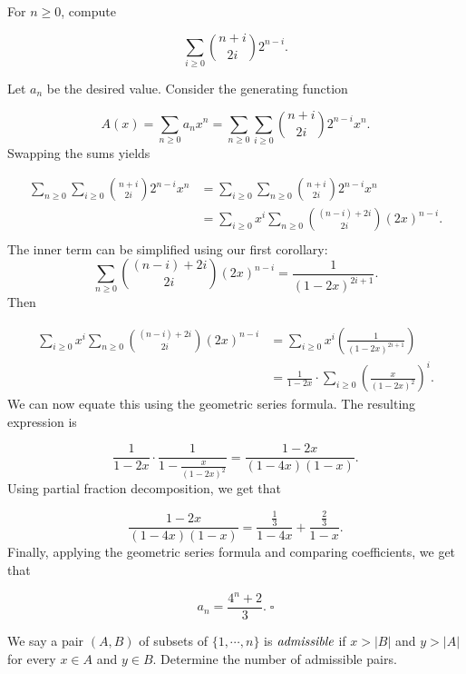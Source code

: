 \documentclass{article}
\begin{document}
\begin{exam}
For $n \ge 0$, compute

\[\sum_{i \ge 0}\binom{n+i}{2i}2^{n-i}.\]
\end{exam}
\begin{sol}
Let $a_n$ be the desired value. Consider the generating function

\[A(x) = \sum_{n \ge 0}a_nx^n = \sum_{n \ge 0}\sum_{i \ge 0}\binom{n+i}{2i}2^{n-i}x^n.\]
Swapping the sums yields

\begin{align*}
\sum_{n \ge 0}\sum_{i \ge 0}\binom{n+i}{2i}2^{n-i}x^n & = \sum_{i \ge 0}\sum_{n \ge 0}\binom{n+i}{2i}2^{n-i}x^n\\
& = \sum_{i \ge 0}x^i\sum_{n \ge 0}\binom{(n-i) + 2i}{2i}(2x)^{n-i}.\\
\end{align*}
The inner term can be simplified using our first corollary:
\[\sum_{n \ge 0}\binom{(n-i) + 2i}{2i}(2x)^{n-i} = \frac{1}{(1-2x)^{2i+1}}.\]
Then

\begin{align*}
\sum_{i \ge 0}x^i\sum_{n \ge 0}\binom{(n-i) + 2i}{2i}(2x)^{n-i} & = \sum_{i \ge 0}x^i\left(\frac{1}{(1-2x)^{2i+1}}\right)\\
& = \frac{1}{1-2x} \cdot \sum_{i \ge 0} \left(\frac{x}{(1-2x)^2}\right)^i.
\end{align*}
We can now equate this using the geometric series formula. The resulting expression is

\[\frac{1}{1-2x} \cdot \frac{1}{1 - \tfrac{x}{(1-2x)^2}} = \frac{1-2x}{(1-4x)(1-x)}.\]
Using partial fraction decomposition, we get that

\[\frac{1-2x}{(1-4x)(1-x)} = \frac{\tfrac13}{1-4x} + \frac{\tfrac23}{1-x}.\]
Finally, applying the geometric series formula and comparing coefficients, we get that

\[a_n = \frac{4^n + 2}{3}. \; \square\]
\end{sol}

\begin{exam}[Putnam 1990]
We say a pair $(A, B)$ of subsets of $\{1, \cdots, n\}$ is $\emph{admissible}$ if $x > |B|$ and $y > |A|$ for every $x \in A$ and $y \in B$. Determine the number of admissible pairs.
\end{exam}
\end{document}
